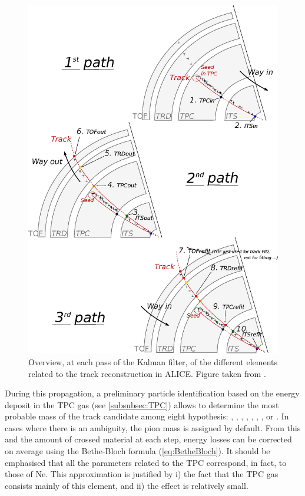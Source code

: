 \begin{figure}[!t]
	\centering
	\includegraphics[width=1.05\textwidth]{Figs/Chapter3/Schema-PcpTrackingALICE.eps}
	\caption{Overview, at each pass of the Kalman filter, of the different elements related to the track reconstruction in ALICE. Figure taken from \cite{maireTrackReconstructionPrinciple2011}.}
	\label{fig:Kalmanfiltering}
\end{figure}

During this propagation, a preliminary particle identification based on the energy deposit in the TPC gas (see \Sec\ref{subsubsec:TPC}) allows to determine the most probable mass of the track candidate among eight hypothesis: \ePlusMinus, \muPlusMinus, \rmPiPlusMinus, \Kplusmin, \pOrPbar, \rmDeutonPM, \rmTritonPM, \rmHeThreePM or \rmHeFourPM. In cases where there is an ambiguity, the pion mass is assigned by default. From this and the amount of crossed material at each step, energy losses can be corrected on average using the Bethe-Bloch formula (\eq\ref{eq:BetheBloch}). It should be emphasised that all the parameters related to the TPC correspond, in fact, to those of Ne. This approximation is justified by i) the fact that the TPC gas consists mainly of this element, and ii) the effect is relatively small. 

